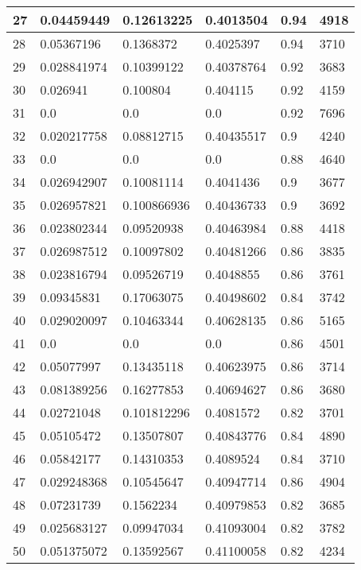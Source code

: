 \begin{longtable}{|l|l|l|l|l|l|}
27 & 0.04459449 & 0.12613225 & 0.4013504 & 0.94 & 4918 \\ \hline 
28 & 0.05367196 & 0.1368372 & 0.4025397 & 0.94 & 3710 \\ \hline 
29 & 0.028841974 & 0.10399122 & 0.40378764 & 0.92 & 3683 \\ \hline 
30 & 0.026941 & 0.100804 & 0.404115 & 0.92 & 4159 \\ \hline 
31 & 0.0 & 0.0 & 0.0 & 0.92 & 7696 \\ \hline 
32 & 0.020217758 & 0.08812715 & 0.40435517 & 0.9 & 4240 \\ \hline 
33 & 0.0 & 0.0 & 0.0 & 0.88 & 4640 \\ \hline 
34 & 0.026942907 & 0.10081114 & 0.4041436 & 0.9 & 3677 \\ \hline 
35 & 0.026957821 & 0.100866936 & 0.40436733 & 0.9 & 3692 \\ \hline 
36 & 0.023802344 & 0.09520938 & 0.40463984 & 0.88 & 4418 \\ \hline 
37 & 0.026987512 & 0.10097802 & 0.40481266 & 0.86 & 3835 \\ \hline 
38 & 0.023816794 & 0.09526719 & 0.4048855 & 0.86 & 3761 \\ \hline 
39 & 0.09345831 & 0.17063075 & 0.40498602 & 0.84 & 3742 \\ \hline 
40 & 0.029020097 & 0.10463344 & 0.40628135 & 0.86 & 5165 \\ \hline 
41 & 0.0 & 0.0 & 0.0 & 0.86 & 4501 \\ \hline 
42 & 0.05077997 & 0.13435118 & 0.40623975 & 0.86 & 3714 \\ \hline 
43 & 0.081389256 & 0.16277853 & 0.40694627 & 0.86 & 3680 \\ \hline 
44 & 0.02721048 & 0.101812296 & 0.4081572 & 0.82 & 3701 \\ \hline 
45 & 0.05105472 & 0.13507807 & 0.40843776 & 0.84 & 4890 \\ \hline 
46 & 0.05842177 & 0.14310353 & 0.4089524 & 0.84 & 3710 \\ \hline 
47 & 0.029248368 & 0.10545647 & 0.40947714 & 0.86 & 4904 \\ \hline 
48 & 0.07231739 & 0.1562234 & 0.40979853 & 0.82 & 3685 \\ \hline 
49 & 0.025683127 & 0.09947034 & 0.41093004 & 0.82 & 3782 \\ \hline 
50 & 0.051375072 & 0.13592567 & 0.41100058 & 0.82 & 4234 \\ \hline 
\end{longtable}